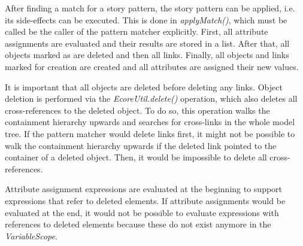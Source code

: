 After finding a match for a story pattern, the story pattern can be applied, i.e. its side-effects can be executed.
This is done in \emph{applyMatch()}, which must be called be the caller of the pattern matcher explicitly.
First, all attribute assignments are evaluated and their results are stored in a list.
After that, all objects marked as \destroy are deleted and then all links.
Finally, all objects and links marked for creation are created and all attributes are assigned their new values.

It is important that all objects are deleted before deleting any links.
Object deletion is performed via the \emph{EcoreUtil.delete()} operation, which also deletes all cross-references to the deleted object.
To do so, this operation walks the containment hierarchy upwards and searches for cross-links in the whole model tree.
If the pattern matcher would delete links first, it might not be possible to walk the containment hierarchy upwards if the deleted link pointed to the container of a deleted object.
Then, it would be impossible to delete all cross-references.

Attribute assignment expressions are evaluated at the beginning to support expressions that refer to deleted elements. 
If attribute assignments would be evaluated at the end, it would not be possible to evaluate expressions with references to deleted elements because these do not exist anymore in the \emph{VariableScope}.


